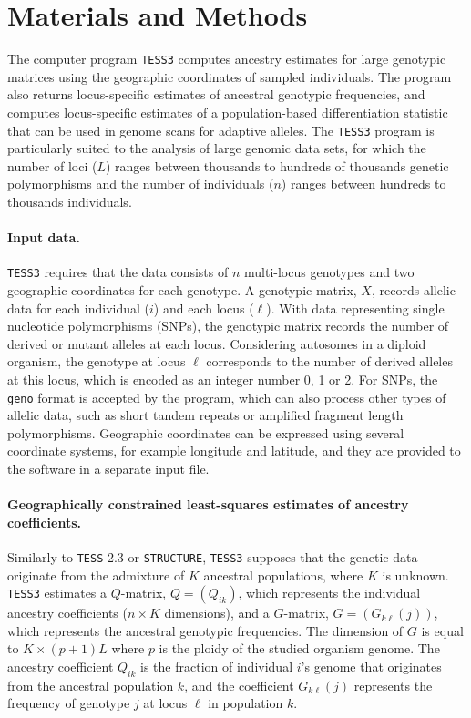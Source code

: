 

\section{Materials and Methods}
\label{sec:MM}

The computer program {\tt TESS3} computes ancestry estimates for large genotypic matrices using the geographic coordinates of sampled individuals. The program also returns locus-specific estimates of ancestral genotypic frequencies, and computes locus-specific estimates of a population-based differentiation statistic that can be used in genome scans for adaptive alleles. The {\tt TESS3} program is particularly suited to the analysis of large genomic data sets, for which the number of loci ($L$) ranges between thousands to hundreds of thousands genetic polymorphisms and the number of individuals ($n$) ranges between hundreds to thousands individuals.


\paragraph{Input data.} 
{\tt TESS3} requires  that the data consists of $n$ multi-locus genotypes and two geographic coordinates for each genotype. A genotypic matrix, $X$, records allelic data for each individual ($i$) and each locus ($\ell$).  With data representing single nucleotide polymorphisms (SNPs), the genotypic matrix records the number of derived or mutant alleles at each locus. Considering autosomes in a diploid organism, the genotype at locus $\ell$ corresponds to the number of derived alleles at this locus, which is encoded as an integer number 0, 1 or 2. For SNPs, the {\tt geno} format is accepted by the program, which can also process other types of allelic data, such as short tandem repeats or amplified fragment length polymorphisms.  Geographic coordinates can be expressed using several coordinate systems, for example longitude and latitude, and they are provided to the software in a separate input file.


\paragraph{Geographically constrained least-squares estimates of ancestry coefficients.} 

Similarly to {\tt TESS} 2.3 or {\tt STRUCTURE}, {\tt TESS3} supposes that the genetic data originate from the admixture of $K$ ancestral populations, where $K$ is unknown. {\tt TESS3} estimates a $Q$-matrix, $Q = (Q_{ik}) $, which represents the individual ancestry coefficients ($n\times K$ dimensions), and a $G$-matrix, $G= (G_{k\ell}(j))$, which represents the ancestral genotypic frequencies. The dimension of $G$ is equal to $K\times (p+1) L$ where $p$ is the ploidy of the studied organism genome. The ancestry coefficient $Q_{ik}$ is the fraction of individual $i$'s genome that originates from the ancestral population $k$, and the coefficient $G_{k\ell}(j)$ represents the frequency of genotype $j$ at locus $\ell$ in population $k$. 

